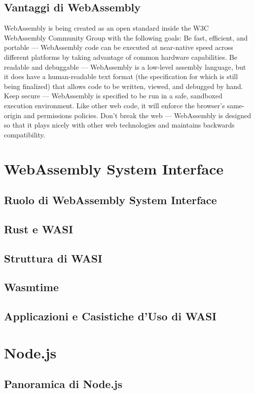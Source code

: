 \newpage
\subsection{Vantaggi di WebAssembly}
WebAssembly is being created as an open standard inside the W3C WebAssembly Community Group with the following goals:
Be fast, efficient, and portable — WebAssembly code can be executed at near-native speed across different platforms by taking advantage of common hardware capabilities.
Be readable and debuggable — WebAssembly is a low-level assembly language, but it does have a human-readable text format (the specification for which is still being finalized) that allows code to be written, viewed, and debugged by hand.
Keep secure — WebAssembly is specified to be run in a safe, sandboxed execution environment. Like other web code, it will enforce the browser's same-origin and permissions policies.
Don't break the web — WebAssembly is designed so that it plays nicely with other web technologies and maintains backwards compatibility.


\newpage
\section{WebAssembly System Interface}
\label{sec:WASI}
\subsection{Ruolo di WebAssembly System Interface}
\subsection{Rust e WASI}
\subsection{Struttura di WASI}
\subsection{Wasmtime}
\subsection{Applicazioni e Casistiche d'Uso di WASI}

\newpage
\section{Node.js}
\label{sec:Node}
\subsection{Panoramica di Node.js}
